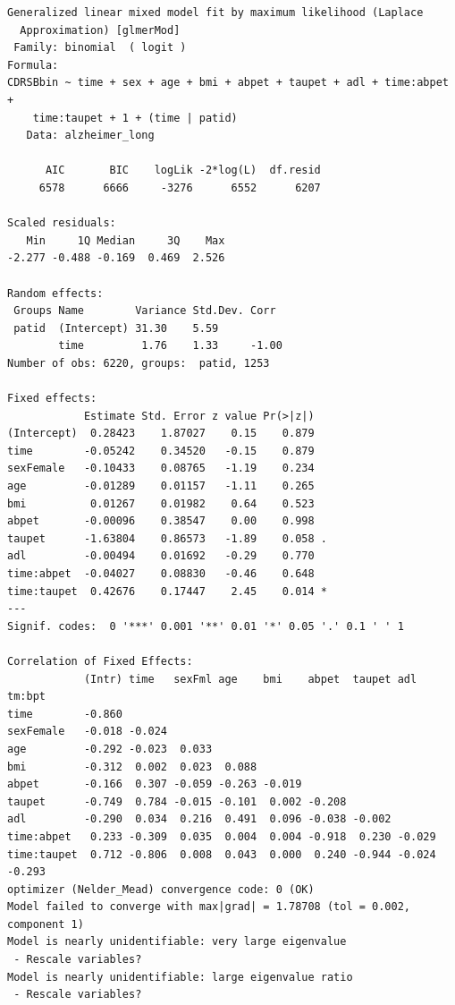 \documentclass[
  11pt,
  letterpaper,
  DIV=11,
  numbers=noendperiod]{scrartcl}
\begin{document}
\begin{verbatim}
Generalized linear mixed model fit by maximum likelihood (Laplace
  Approximation) [glmerMod]
 Family: binomial  ( logit )
Formula: 
CDRSBbin ~ time + sex + age + bmi + abpet + taupet + adl + time:abpet +  
    time:taupet + 1 + (time | patid)
   Data: alzheimer_long

      AIC       BIC    logLik -2*log(L)  df.resid 
     6578      6666     -3276      6552      6207 

Scaled residuals: 
   Min     1Q Median     3Q    Max 
-2.277 -0.488 -0.169  0.469  2.526 

Random effects:
 Groups Name        Variance Std.Dev. Corr 
 patid  (Intercept) 31.30    5.59          
        time         1.76    1.33     -1.00
Number of obs: 6220, groups:  patid, 1253

Fixed effects:
            Estimate Std. Error z value Pr(>|z|)  
(Intercept)  0.28423    1.87027    0.15    0.879  
time        -0.05242    0.34520   -0.15    0.879  
sexFemale   -0.10433    0.08765   -1.19    0.234  
age         -0.01289    0.01157   -1.11    0.265  
bmi          0.01267    0.01982    0.64    0.523  
abpet       -0.00096    0.38547    0.00    0.998  
taupet      -1.63804    0.86573   -1.89    0.058 .
adl         -0.00494    0.01692   -0.29    0.770  
time:abpet  -0.04027    0.08830   -0.46    0.648  
time:taupet  0.42676    0.17447    2.45    0.014 *
---
Signif. codes:  0 '***' 0.001 '**' 0.01 '*' 0.05 '.' 0.1 ' ' 1

Correlation of Fixed Effects:
            (Intr) time   sexFml age    bmi    abpet  taupet adl    tm:bpt
time        -0.860                                                        
sexFemale   -0.018 -0.024                                                 
age         -0.292 -0.023  0.033                                          
bmi         -0.312  0.002  0.023  0.088                                   
abpet       -0.166  0.307 -0.059 -0.263 -0.019                            
taupet      -0.749  0.784 -0.015 -0.101  0.002 -0.208                     
adl         -0.290  0.034  0.216  0.491  0.096 -0.038 -0.002              
time:abpet   0.233 -0.309  0.035  0.004  0.004 -0.918  0.230 -0.029       
time:taupet  0.712 -0.806  0.008  0.043  0.000  0.240 -0.944 -0.024 -0.293
optimizer (Nelder_Mead) convergence code: 0 (OK)
Model failed to converge with max|grad| = 1.78708 (tol = 0.002, component 1)
Model is nearly unidentifiable: very large eigenvalue
 - Rescale variables?
Model is nearly unidentifiable: large eigenvalue ratio
 - Rescale variables?
\end{verbatim}
\end{document}
